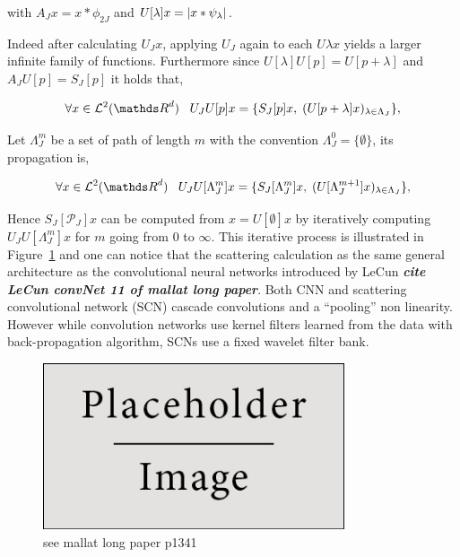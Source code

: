 \documentclass[a4paper,11pt]{report}
\begin{document}
{\begin{defn}
				with $A_{J}x = x \ast \phi_{2J}$ and $U[\lambda]x = \left| x \ast \psi_{\lambda} \right|$.
				\label{def:One step propagator}
			\end{defn}
			
			Indeed after calculating $U_{J}x$, applying $U_{J}$ again to each $U{\lambda}x$ yields a larger infinite family of functions. Furthermore since $U[\lambda]U[p] = U[p+\lambda]$ and $ A_{J}U[p] = S_{J}[p]$ it holds that,
			
			\begin{equation}
					\forall x \in \mathcal{L}^{2}(\dsR^{d}) \;\;\; U_{J}U[p] x = \{ S_{J}[p]x , \; (U[p+\lambda]x)_{\lambda \in \Lambda_{J}} \},
					\label{eq:SCN propagation 1}
			\end{equation}
			
			Let $\Lambda_{J}^{m}$ be a set of path of length $m$ with the convention $\Lambda_{J}^{0} = \{ \emptyset \}$, its propagation is,
			
			\begin{equation}
					\forall x \in \mathcal{L}^{2}(\dsR^{d}) \;\;\; U_{J}U[\Lambda_{J}^{m}] x = \{ S_{J}[\Lambda_{J}^{m}]x , \; (U[\Lambda_{J}^{m+1}]x)_{\lambda \in \Lambda_{J}} \},
					\label{eq:SCN propagation 2}
			\end{equation}
			
			Hence $S_{J}[\mathcal{P}_{J}]x$ can be computed from $x= U[\emptyset]x$ by iteratively computing $U_{J}U[\Lambda_{J}^{m}] x$ for $m$ going from $0$ to $\infty$. This iterative process is illustrated in Figure~\ref{fig:SCN} and one can notice that the scattering calculation as the same general architecture as the convolutional neural networks introduced by LeCun \textbf{\textit{cite LeCun convNet 11 of mallat long paper}}. Both CNN and scattering convolutional network (SCN) cascade convolutions and a ``pooling'' non linearity. However while convolution networks use kernel filters learned from the data with back-propagation algorithm, SCNs use a fixed wavelet filter bank. 

      \begin{figure}
				\begin{center}
					\includegraphics[width=3.5in]{placeholder.jpg}
					\caption[The scattering convolutional network architecture]{see mallat long paper p1341}
					\label{fig:SCN}
				\end{center}	
      \end{figure}
      
}
\end{document}
